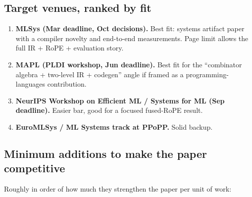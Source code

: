 \documentclass[11pt]{article}
\begin{document}
\subsection{Target venues, ranked by fit}

\begin{enumerate}[leftmargin=1.4em,itemsep=2pt]
  \item \textbf{MLSys (Mar deadline, Oct decisions).} Best fit: systems
        artifact paper with a compiler novelty and end-to-end measurements.
        Page limit allows the full IR + RoPE + evaluation story.
  \item \textbf{MAPL (PLDI workshop, Jun deadline).} Best fit for the
        ``combinator algebra + two-level IR + codegen'' angle if framed as
        a programming-languages contribution.
  \item \textbf{NeurIPS Workshop on Efficient ML / Systems for ML
        (Sep deadline).} Easier bar, good for a focused fused-RoPE result.
  \item \textbf{EuroMLSys / ML Systems track at PPoPP.} Solid backup.
\end{enumerate}

\subsection{Minimum additions to make the paper competitive}

Roughly in order of how much they strengthen the paper per unit of work:
\end{document}
